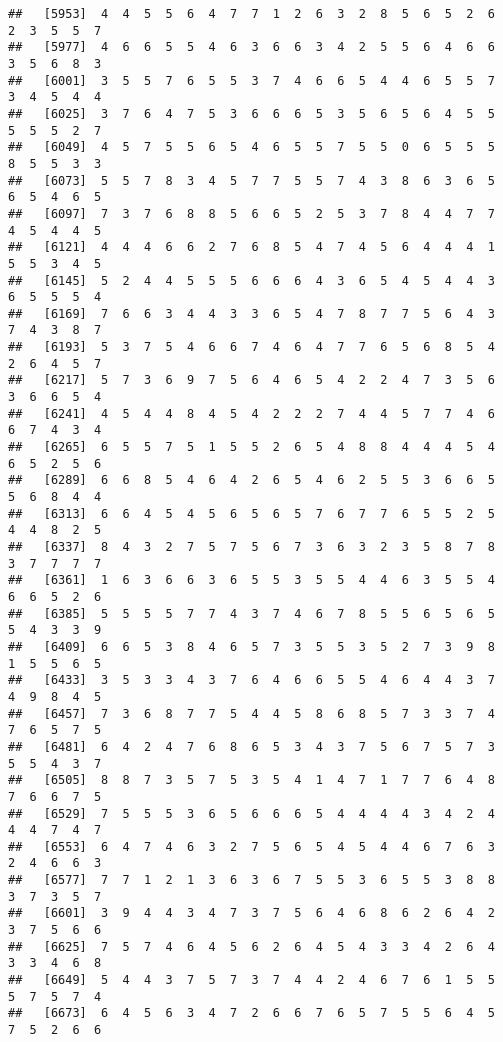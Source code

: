 \documentclass[
]{book}
\begin{document}
\begin{verbatim}
##   [5953]  4  4  5  5  6  4  7  7  1  2  6  3  2  8  5  6  5  2  6  2  3  5  5  7
##   [5977]  4  6  6  5  5  4  6  3  6  6  3  4  2  5  5  6  4  6  6  3  5  6  8  3
##   [6001]  3  5  5  7  6  5  5  3  7  4  6  6  5  4  4  6  5  5  7  3  4  5  4  4
##   [6025]  3  7  6  4  7  5  3  6  6  6  5  3  5  6  5  6  4  5  5  5  5  5  2  7
##   [6049]  4  5  7  5  5  6  5  4  6  5  5  7  5  5  0  6  5  5  5  8  5  5  3  3
##   [6073]  5  5  7  8  3  4  5  7  7  5  5  7  4  3  8  6  3  6  5  6  5  4  6  5
##   [6097]  7  3  7  6  8  8  5  6  6  5  2  5  3  7  8  4  4  7  7  4  5  4  4  5
##   [6121]  4  4  4  6  6  2  7  6  8  5  4  7  4  5  6  4  4  4  1  5  5  3  4  5
##   [6145]  5  2  4  4  5  5  5  6  6  6  4  3  6  5  4  5  4  4  3  6  5  5  5  4
##   [6169]  7  6  6  3  4  4  3  3  6  5  4  7  8  7  7  5  6  4  3  7  4  3  8  7
##   [6193]  5  3  7  5  4  6  6  7  4  6  4  7  7  6  5  6  8  5  4  2  6  4  5  7
##   [6217]  5  7  3  6  9  7  5  6  4  6  5  4  2  2  4  7  3  5  6  3  6  6  5  4
##   [6241]  4  5  4  4  8  4  5  4  2  2  2  7  4  4  5  7  7  4  6  6  7  4  3  4
##   [6265]  6  5  5  7  5  1  5  5  2  6  5  4  8  8  4  4  4  5  4  6  5  2  5  6
##   [6289]  6  6  8  5  4  6  4  2  6  5  4  6  2  5  5  3  6  6  5  5  6  8  4  4
##   [6313]  6  6  4  5  4  5  6  5  6  5  7  6  7  7  6  5  5  2  5  4  4  8  2  5
##   [6337]  8  4  3  2  7  5  7  5  6  7  3  6  3  2  3  5  8  7  8  3  7  7  7  7
##   [6361]  1  6  3  6  6  3  6  5  5  3  5  5  4  4  6  3  5  5  4  6  6  5  2  6
##   [6385]  5  5  5  5  7  7  4  3  7  4  6  7  8  5  5  6  5  6  5  5  4  3  3  9
##   [6409]  6  6  5  3  8  4  6  5  7  3  5  5  3  5  2  7  3  9  8  1  5  5  6  5
##   [6433]  3  5  3  3  4  3  7  6  4  6  6  5  5  4  6  4  4  3  7  4  9  8  4  5
##   [6457]  7  3  6  8  7  7  5  4  4  5  8  6  8  5  7  3  3  7  4  7  6  5  7  5
##   [6481]  6  4  2  4  7  6  8  6  5  3  4  3  7  5  6  7  5  7  3  5  5  4  3  7
##   [6505]  8  8  7  3  5  7  5  3  5  4  1  4  7  1  7  7  6  4  8  7  6  6  7  5
##   [6529]  7  5  5  5  3  6  5  6  6  6  5  4  4  4  4  3  4  2  4  4  4  7  4  7
##   [6553]  6  4  7  4  6  3  2  7  5  6  5  4  5  4  4  6  7  6  3  2  4  6  6  3
##   [6577]  7  7  1  2  1  3  6  3  6  7  5  5  3  6  5  5  3  8  8  3  7  3  5  7
##   [6601]  3  9  4  4  3  4  7  3  7  5  6  4  6  8  6  2  6  4  2  3  7  5  6  6
##   [6625]  7  5  7  4  6  4  5  6  2  6  4  5  4  3  3  4  2  6  4  3  3  4  6  8
##   [6649]  5  4  4  3  7  5  7  3  7  4  4  2  4  6  7  6  1  5  5  5  7  5  7  4
##   [6673]  6  4  5  6  3  4  7  2  6  6  7  6  5  7  5  5  6  4  5  7  5  2  6  6

\end{verbatim}
\end{document}

